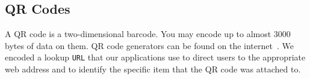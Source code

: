 \subsection{QR Codes}
\label{sec:qrc}
A QR code is a two-dimensional barcode.  You may encode up to almost 3000 bytes of data on them.  QR code generators
can be found on the internet~\cite{qrcgen1, qrcgen2}.  We encoded a lookup {\tt URL} that our applications use to
direct users to the appropriate web address and to identify the specific item that the QR code was attached to.



